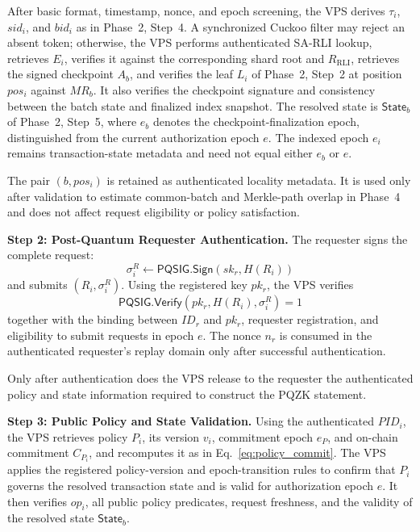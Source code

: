 \documentclass[lettersize,journal]{IEEEtran}
\begin{document}
After basic format, timestamp, nonce, and epoch screening, the VPS
derives $\tau_i$, $sid_i$, and $bid_i$ as in Phase~2, Step~4. A
synchronized Cuckoo filter may reject an absent token; otherwise, the
VPS performs authenticated SA-RLI lookup, retrieves $E_i$, verifies it
against the corresponding shard root and
$R_{\mathrm{RLI}}$, retrieves the signed checkpoint $A_b$, and verifies
the leaf $L_i$ of Phase~2, Step~2 at position $pos_i$ against $MR_b$. It also verifies the checkpoint
signature and consistency between the batch state and finalized index
snapshot. The resolved state is $\mathsf{State}_b$ of Phase~2, Step~5,
where $e_b$ denotes the checkpoint-finalization epoch, distinguished
from the current authorization epoch $e$. The indexed epoch $e_i$
remains transaction-state metadata and need not equal either $e_b$ or
$e$.

The pair $(b,pos_i)$ is retained as authenticated locality metadata.
It is used only after validation to estimate common-batch and
Merkle-path overlap in Phase~4 and does not affect request eligibility
or policy satisfaction.

\medskip
\noindent\textbf{Step 2: Post-Quantum Requester Authentication.}
The requester signs the complete request:
\begin{equation}
\sigma_i^R\leftarrow
\mathsf{PQSIG.Sign}(sk_r,H(R_i))
\end{equation}
and submits $(R_i,\sigma_i^R)$. Using the registered key $pk_r$, the
VPS verifies
\begin{equation}
\mathsf{PQSIG.Verify}
(pk_r,H(R_i),\sigma_i^R)=1
\label{eq:req_sig}
\end{equation}
together with the binding between $ID_r$ and $pk_r$, requester
registration, and eligibility to submit requests in epoch $e$.
The nonce $n_r$ is consumed in the authenticated requester's replay
domain only after successful authentication.

Only after authentication does the VPS release to the requester the
authenticated policy and state information required to construct the
PQZK statement.

\medskip
\noindent\textbf{Step 3: Public Policy and State Validation.}
Using the authenticated $PID_i$, the VPS retrieves policy $P_i$, its
version $v_i$, commitment epoch $e_P$, and on-chain commitment
$C_{P_i}$, and recomputes it as in Eq.~\eqref{eq:policy_commit}.
The VPS applies the registered policy-version and epoch-transition rules
to confirm that $P_i$ governs the resolved transaction state and is
valid for authorization epoch $e$. It then verifies $op_i$, all public
policy predicates, request freshness, and the validity of the resolved
state $\mathsf{State}_b$.
\end{document}
